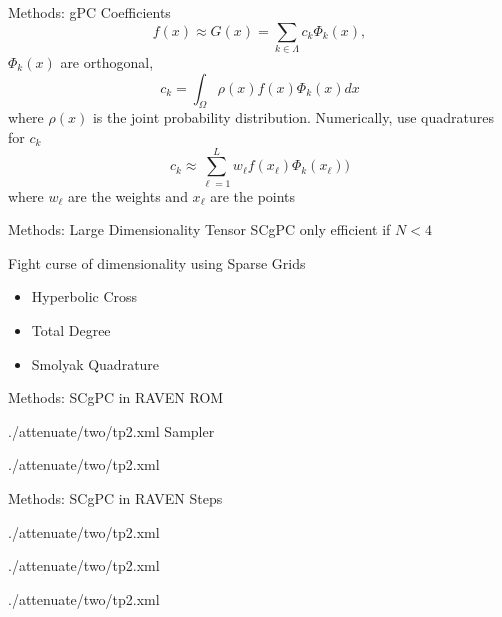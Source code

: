 \documentclass[t,9pt,svgnames]{beamer}
\begin{document}
\begin{frame}{Methods: gPC Coefficients}
  \vfill
  \begin{equation}
    f(x) \approx G(x) = \sum_{k\in\Lambda} c_k \Phi_k(x), 
  \end{equation}
  \vfill
  $\Phi_k(x)$ are orthogonal,
  \begin{equation}
    c_k = \int_\Omega \rho(x) f(x) \Phi_k(x) dx
  \end{equation}
  where $\rho(x)$ is the joint probability distribution.
  \vfill
  Numerically, use quadratures for $c_k$
  \begin{equation}
    c_k \approx\sum_{\ell=1}^L w_\ell f(x_\ell) \Phi_k(x_\ell))
  \end{equation}
  where $w_\ell$ are the weights and $x_\ell$ are the points
  \vfill
\end{frame}

\begin{frame}{Methods: Large Dimensionality}
  \vfill
  Tensor SCgPC only efficient if $N<4$
  \vfill

  Fight curse of dimensionality using Sparse Grids
  \vfill
  \begin{itemize}
    \item Hyperbolic Cross
    \item Total Degree
  \vfill
    \item Smolyak Quadrature
  \end{itemize}
  \vfill
\end{frame}

\begin{frame}[fragile]{Methods: SCgPC in RAVEN}
  ROM
  
          {./attenuate/two/tp2.xml}
  \vfill
  Sampler
  
          {./attenuate/two/tp2.xml}
\end{frame}

\begin{frame}[fragile]{Methods: SCgPC in RAVEN}
  Steps
  
          {./attenuate/two/tp2.xml}
  
          {./attenuate/two/tp2.xml}
  
          {./attenuate/two/tp2.xml}
\end{frame}
\end{document}
